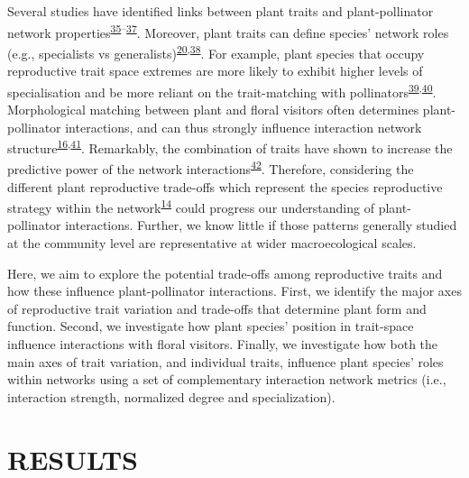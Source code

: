 \documentclass[
  12pt,
  a4paper,
]{article}
\begin{document}
Several studies have identified links between plant traits and plant-pollinator network properties\textsuperscript{\protect\hyperlink{ref-bartomeus2013}{35}--\protect\hyperlink{ref-rowe2020}{37}}. Moreover, plant traits can define species' network roles (e.g., specialists vs generalists)\textsuperscript{\protect\hyperlink{ref-tur2013}{20},\protect\hyperlink{ref-lazaro2013}{38}}. For example, plant species that occupy reproductive trait space extremes are more likely to exhibit higher levels of specialisation and be more reliant on the trait-matching with pollinators\textsuperscript{\protect\hyperlink{ref-junker2013}{39},\protect\hyperlink{ref-coux2016}{40}}. Morphological matching between plant and floral visitors often determines plant-pollinator interactions, and can thus strongly influence interaction network structure\textsuperscript{\protect\hyperlink{ref-stang2009}{16},\protect\hyperlink{ref-ibanez2012}{41}}. Remarkably, the combination of traits have shown to increase the predictive power of the network interactions\textsuperscript{\protect\hyperlink{ref-eklof2013}{42}}. Therefore, considering the different plant reproductive trade-offs which represent the species reproductive strategy within the network\textsuperscript{\protect\hyperlink{ref-dehling2016}{14}} could progress our understanding of plant-pollinator interactions. Further, we know little if those patterns generally studied at the community level are representative at wider macroecological scales.

Here, we aim to explore the potential trade-offs among reproductive traits and how these influence plant-pollinator interactions. First, we identify the major axes of reproductive trait variation and trade-offs that determine plant form and function. Second, we investigate how plant species' position in trait-space influence interactions with floral visitors. Finally, we investigate how both the main axes of trait variation, and individual traits, influence plant species' roles within networks using a set of complementary interaction network metrics (i.e., interaction strength, normalized degree and specialization).

\hypertarget{results}{%
\section{RESULTS}\label{results}}
\end{document}
